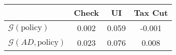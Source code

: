 \begin{tabular}{@{}lccc@{}} 
\toprule 
                          & Check      & UI    & Tax Cut    \\  \midrule 
$\mathcal{G}(\text{policy})$ & 0.002  & 0.059  & -0.001     \\ 
$\mathcal{G}(AD,\text{policy})$ & 0.023  & 0.076  & 0.008     \\ 
\end{tabular}  
